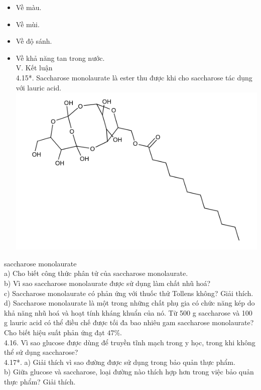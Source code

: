 \documentclass[10pt]{article}
\begin{document}
\begin{itemize}
  \item Về màu.
  \item Về mùi.
  \item Về độ sánh.
  \item Về khả năng tan trong nước.\\
V. Kết luận\\
4.15*. Saccharose monolaurate là ester thu được khi cho saccharose tác dụng với lauric acid.\\
\includegraphics{smile-6ed5beaea46dc16ce0749d12d7229229ff6ce397}
\end{itemize}

saccharose monolaurate\\
a) Cho biết công thức phân tử của saccharose monolaurate.\\
b) Vì sao saccharose monolaurate được sử dụng làm chất nhũ hoá?\\
c) Saccharose monolaurate có phản ứng với thuốc thử Tollens không? Giải thích.\\
d) Saccharose monolaurate là một trong những chất phụ gia có chức năng kép do khả năng nhũ hoá và hoạt tính kháng khuẩn của nó. Từ 500 g saccharose và 100 g lauric acid có thể điều chế được tối đa bao nhiêu gam saccharose monolaurate? Cho biết hiệu suất phản ứng đạt $47 \%$.\\
4.16. Vì sao glucose được dùng để truyền tĩnh mạch trong y học, trong khi không thể sử dụng saccharose?\\
4.17*. a) Giải thích vì sao đường được sử dụng trong bảo quản thực phẩm.\\
b) Giữa glucose và saccharose, loại đường nào thích hợp hơn trong việc bảo quản thực phẩm? Giải thích.
\end{document}

